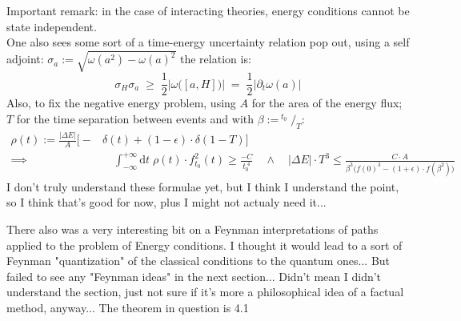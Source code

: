 \documentclass[a4paper,11pt]{article}
\numberwithin{equation}{section}
\theoremstyle{definition}
\begin{document}
Important remark: in the case of interacting theories, energy conditions cannot be state independent.\\

One also sees some sort of a time-energy uncertainty relation pop out, using a self adjoint: $\sigma_a := \sqrt{\omega(a^2)-\omega(a)^2}$ the relation is:
\begin{equation}
    \sigma_H\sigma_a \; \geq \; \frac{1}{2} \bigg|\omega\Big([a,H]\Big)\bigg| \; = \; \frac{1}{2}\big|\partial_t \omega(a)\big|
\end{equation}
Also, to fix the negative energy problem, using $A$ for the area of the energy flux; $T$ for the time separation between events and with $\beta:=^{\;t_0}\!\!\!/_{\!T}$:
\begin{align*}
    \rho(t) := \frac{|\Delta E|}{A}\Big[-&\delta(t) + (1-\epsilon)\cdot\delta(1-T)\Big]\\
    \implies& \quad \int_{-\infty}^{+\infty}\mathrm{d}t \; \rho(t) \cdot f^2_{t_0}(t) \geq \frac{-C}{t_0^{\;4}} \quad \wedge \quad |\Delta E| \cdot T^3 \leq \frac{C\cdot A}{\beta^3\Big(f(0)^3 - (1+\epsilon) \cdot f(\beta^2)\Big)}
\end{align*}
\color{red} I don't truly understand these formulae yet, but I think I understand the point, so I think that's good for now, plus I might not actualy need it...

There also was a very interesting bit on a Feynman interpretations of paths applied to the problem of Energy conditions. I thought it would lead to a sort of Feynman "quantization" of the classical conditions to the quantum ones... But failed to see any "Feynman ideas" in the next section... Didn't mean I didn't understand the section, just not sure if it's more a philosophical idea of a factual method, anyway... The theorem in question is 4.1\color{black}\\
\end{document}
